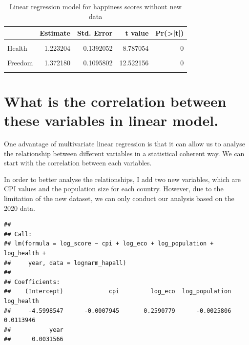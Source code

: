 \documentclass[11pt,a4paper,]{article}
\begin{document}
\begin{table}

\caption{\label{tab:unnamed-chunk-9}Linear regression model for happiness scores without new data}
\centering
\begin{tabular}[t]{l|r|r|r|r}
\hline
  & Estimate & Std. Error & t value & Pr(>|t|)\\
\hline
\cellcolor{gray!6}{(Intercept)} & \cellcolor{gray!6}{2.437442} & \cellcolor{gray!6}{0.0752984} & \cellcolor{gray!6}{32.370444} & \cellcolor{gray!6}{0}\\
\hline
Health & 1.223204 & 0.1392052 & 8.787054 & 0\\
\hline
\cellcolor{gray!6}{Economy} & \cellcolor{gray!6}{1.454316} & \cellcolor{gray!6}{0.0841520} & \cellcolor{gray!6}{17.282015} & \cellcolor{gray!6}{0}\\
\hline
Freedom & 1.372180 & 0.1095802 & 12.522156 & 0\\
\hline
\cellcolor{gray!6}{Generosity} & \cellcolor{gray!6}{1.170207} & \cellcolor{gray!6}{0.1396671} & \cellcolor{gray!6}{8.378545} & \cellcolor{gray!6}{0}\\
\hline
\end{tabular}
\end{table}

\hypertarget{what-is-the-correlation-between-these-variables-in-linear-model.}{%
\section{What is the correlation between these variables in linear model.}\label{what-is-the-correlation-between-these-variables-in-linear-model.}}

One advantage of multivariate linear regression is that it can allow us to analyse the relationship between different variables in a statistical coherent way. We can start with the correlation between each variables.

In order to better analyse the relationships, I add two new variables, which are CPI values and the population size for each country. However, due to the limitation of the new dataset, we can only conduct our analysis based on the 2020 data.

\begin{verbatim}
## 
## Call:
## lm(formula = log_score ~ cpi + log_eco + log_population + log_health + 
##     year, data = lognarm_hapall)
## 
## Coefficients:
##    (Intercept)             cpi         log_eco  log_population      log_health  
##     -4.5998547      -0.0007945       0.2590779      -0.0025806       0.0113946  
##           year  
##      0.0031566
\end{verbatim}
\end{document}

